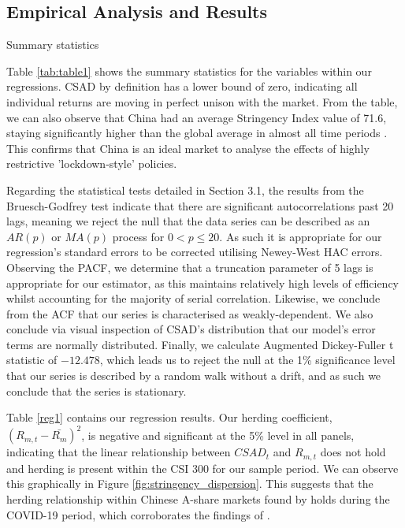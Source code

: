 \documentclass[12pt]{article}
\numberwithin{table}{section}   %
\begin{document}
\subsection{Empirical Analysis and Results}

\begin{table}[!htbp]
\small
    \caption{Summary statistics} \label{tab:table1}
    \centering
    
\end{table}

Table \ref{tab:table1} shows the summary statistics for the variables within our regressions. CSAD by definition has a lower bound of zero, indicating all individual returns are moving in perfect unison with the market. From the table, we can also observe that China had an average Stringency Index value of 71.6, staying significantly higher than the global average in almost all time periods \citep{OxCGRT}. This confirms that China is an ideal market to analyse the effects of highly restrictive 'lockdown-style' policies.

Regarding the statistical tests detailed in Section 3.1, the results from the Bruesch-Godfrey test indicate that there are significant autocorrelations past 20 lags, meaning we reject the null that the data series can be described as an $AR(p)$ or $MA(p)$ process for $0 < p \leq 20$. As such it is appropriate for our regression’s standard errors to be corrected utilising Newey-West HAC errors. Observing the PACF, we determine that a truncation parameter of 5 lags is appropriate for our estimator, as this maintains relatively high levels of efficiency whilst accounting for the majority of serial correlation. Likewise, we conclude from the ACF that our series is characterised as weakly-dependent. We also conclude via visual inspection of CSAD's distribution that our model's error terms are normally distributed. Finally, we calculate Augmented Dickey-Fuller t statistic of $-12.478$, which leads us to reject the null at the 1\% significance level that our series is described by a random walk without a drift, and as such we conclude that the series is stationary.



Table \ref{reg1} contains our regression results. Our herding coefficient, $(R_{m,t}-\bar{R_m})^2$, is negative and significant at the 5\% level in all panels, indicating that the linear relationship between $CSAD_t$ and $R_{m,t}$ does not hold and herding is present within the CSI 300 for our sample period. We can observe this graphically in Figure \ref{fig:stringency_dispersion}. This suggests that the herding relationship within Chinese A-share markets found by \citet{tan, chiangzheng} holds during the COVID-19 period, which corroborates the findings of \citet{wu}.
\end{document}
